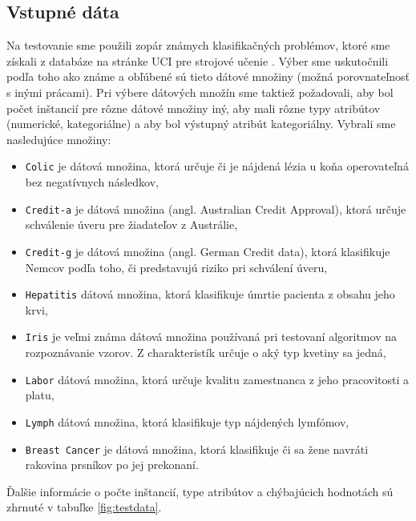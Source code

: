 \subsection{Vstupné dáta}
Na testovanie sme použili zopár známych klasifikačných problémov, ktoré sme získali z databáze na stránke UCI pre strojové učenie \cite{online-uci}. Výber sme uskutočnili podľa toho ako známe a obľúbené sú tieto dátové množiny (možná porovnateľnosť s inými prácami). Pri výbere dátových množín sme taktiež požadovali, aby bol počet inštancií pre rôzne dátové množiny iný, aby mali rôzne typy atribútov (numerické, kategoriálne) a aby bol výstupný atribút kategoriálny. Vybrali sme nasledujúce množiny:
\begin{itemize}
\item \verb|Colic| je dátová množina, ktorá určuje či je nájdená lézia u koňa operovateľná bez negatívnych následkov,
\item \verb|Credit-a| je dátová množina (angl. Australian Credit Approval), ktorá určuje schválenie úveru pre žiadateľov z Austrálie,
\item \verb|Credit-g| je dátová množina (angl. German Credit data), ktorá klasifikuje Nemcov podľa toho, či predstavujú riziko pri schválení úveru,
\item \verb|Hepatitis| dátová množina, ktorá klasifikuje úmrtie pacienta z obsahu jeho krvi,
\item \verb|Iris| je veľmi známa dátová množina používaná pri testovaní algoritmov na rozpoznávanie vzorov. Z charakteristík určuje o aký typ kvetiny sa jedná,
\item \verb|Labor| dátová množina, ktorá určuje kvalitu zamestnanca z jeho pracovitosti a platu,
\item \verb|Lymph| dátová množina, ktorá klasifikuje typ nájdených lymfómov,
\item \verb|Breast Cancer| je dátová množina, ktorá klasifikuje či sa žene navráti rakovina prsníkov po jej prekonaní.
\end{itemize}

Ďalšie informácie o počte inštancií, type atribútov a chýbajúcich hodnotách
sú zhrnuté v tabuľke \ref{fig:testdata}.

